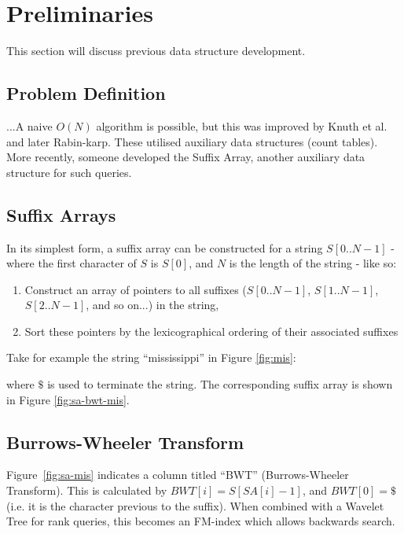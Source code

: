 \section{Preliminaries}
This section will discuss previous data structure development.



\subsection{Problem Definition}
...A naive $O(N)$ algorithm is possible, but this was improved by
Knuth et al. and later Rabin-karp. These utilised auxiliary data
structures (count tables). More recently, someone developed the
Suffix Array, another auxiliary data structure for such queries.



\subsection{Suffix Arrays}
In its simplest form, a suffix array can be constructed for a string
$S[0..N-1]$ - where the first character of $S$ is $S[0]$, and $N$ is the
length of the string - like so:

\begin{enumerate}
	\item
		Construct an array of pointers to all suffixes ($S[0..N-1]$, 
		$S[1..N-1]$, $S[2..N-1]$, and so on...) in the string,
	\item
		Sort these pointers by the lexicographical ordering of their associated
		suffixes
\end{enumerate}

Take for example the string ``mississippi'' in Figure \ref{fig:mis}:



where $\$$ is used to terminate the string. The corresponding suffix array is
shown in Figure \ref{fig:sa-bwt-mis}.





\subsection{Burrows-Wheeler Transform}
Figure~\ref{fig:sa-mis} indicates a column titled ``BWT'' (Burrows-Wheeler
Transform). This is calculated by $BWT[i] = S[SA[i]-1]$, and $BWT[0] = \$$
(i.e. it is the character previous to the suffix). When combined with a Wavelet
Tree for rank queries, this becomes an FM-index which allows backwards search.

